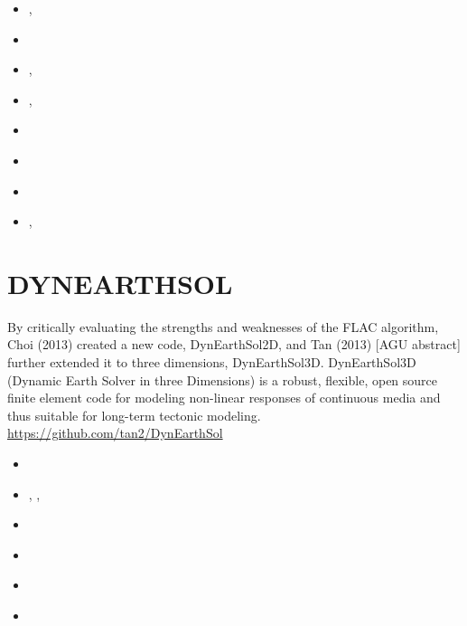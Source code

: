 \begin{small}
\begin{itemize}
\item[\twothousandeight]     \textcite{brtf08}, \textcite{thfb08}
\item[\twothousandnine]      \textcite{yahb09}
\item[\twothousandten]       \textcite{brya10}, \textcite{lobh10}
\item[\twothousandfourteen]  \textcite{mutg14}, \textcite{whbb14}
\item[\twothousandeighteen]  \textcite{neew18}
\item[\twothousandnineteen]  \textcite{koen19}
\item[\twothousandtwenty]    \textcite{scwh20}
\item[\twothousandtwentytwo] \textcite{kone22}, \textcite{konf22}
\end{itemize}
\end{small} 

\section{DYNEARTHSOL} 

By critically evaluating the strengths and weaknesses of the
FLAC algorithm, Choi \etal (2013) created a new code, DynEarthSol2D, 
and Tan \etal (2013) [AGU abstract] further extended it to three
dimensions, DynEarthSol3D. DynEarthSol3D (Dynamic Earth Solver
in three Dimensions) is a robust, flexible, open source finite
element code for modeling non-linear responses of continuous
media and thus suitable for long-term tectonic modeling.
\url{https://github.com/tan2/DynEarthSol}

\begin{small} 
\begin{itemize}
\item[2013] \textcite{chtl13}
\item[2015] \textcite{jalr15}, \textcite{tact15}, \textcite{febc15}
\item[2017] \textcite{lolc17}
\item[2018] \textcite{tola18} 
\item[2024] \textcite{letc24}
\item[2026] \textcite{huta26}
\end{itemize}
\end{small} 


